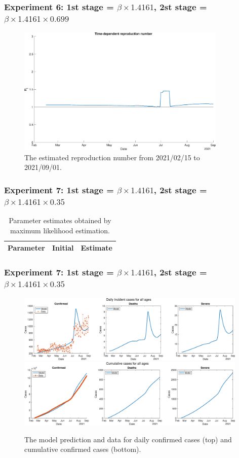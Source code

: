 \documentclass[aspectratio=169, 9pt, xcolor=dvipsnames]{beamer}
\begin{document}
	\begin{frame}\frametitle{Experiment 6: 1st stage = $\beta \times 1.4161$, 2st stage = $\beta \times 1.4161 \times 0.699$}
	    \begin{figure}
	    	\centering
	    	\includegraphics[width=10cm]{../results/estimate_sd_1st_2_2nd_2/rep_num.eps}
	    	\caption{The estimated reproduction number from 2021/02/15 to 2021/09/01.}
	    \end{figure}
	\end{frame}

	\begin{frame}\frametitle{Experiment 7: 1st stage = $\beta \times 1.4161$, 2st stage = $\beta \times 1.4161 \times 0.35$}
	    \begin{table}
	    	\begin{tabular}{crr}
	    		\toprule
	    		\textbf{Parameter} & \textbf{Initial} & \textbf{Estimate} \\
	    		\midrule
	    		
	    		\bottomrule
	    	\end{tabular}
	    	\caption{Parameter estimates obtained by maximum likelihood estimation.}
	    \end{table}
	\end{frame}

	\begin{frame}\frametitle{Experiment 7: 1st stage = $\beta \times 1.4161$, 2st stage = $\beta \times 1.4161 \times 0.35$}
	    \begin{figure}
	    	\centering
	    	\includegraphics[width=11cm]{../results/estimate_sd_1st_2_2nd_3/daily_all_age.eps}
	    	\includegraphics[width=11cm]{../results/estimate_sd_1st_2_2nd_3/cumul_all_age.eps}
	    	\caption{The model prediction and data for daily confirmed cases (top) and cumulative confirmed cases (bottom).}
	    \end{figure}
	\end{frame}
\end{document}
